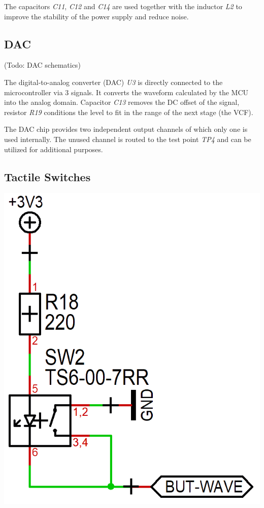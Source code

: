 \documentclass{scrartcl}
\begin{document}
The capacitors \emph{C11}, \emph{C12} and \emph{C14} are used together with the inductor \emph{L2} to improve the stability of the power supply and reduce noise.

\subsection{DAC}

\begin{center}
    (Todo: DAC schematics)
\end{center}

The digital-to-analog converter (DAC) \emph{U3} is directly connected to the microcontroller via 3 signals. It converts the waveform calculated by the MCU into the analog domain. Capacitor \emph{C13} removes the DC offset of the signal, resistor \emph{R19} conditions the level to fit in the range of the next stage (the VCF).

The DAC chip provides two independent output channels of which only one is used internally. The unused channel is routed to the test point \emph{TP4} and can be utilized for additional purposes.

\subsection{Tactile Switches}

\begin{center}
    \includegraphics[scale=0.25]{assets/schema-switch.png}
\end{center}
\end{document}
